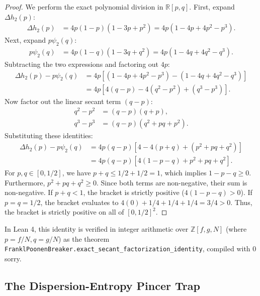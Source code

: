 \documentclass[11pt,a4paper]{article}
\theoremstyle{plain}
\theoremstyle{definition}
\theoremstyle{remark}
\newcommand{\R}{\mathbb{R}}
\newcommand{\Z}{\mathbb{Z}}
\begin{document}
\begin{proof}
We perform the exact polynomial division in $\R[p, q]$. First, expand $\Delta h_2(p)$:
\begin{align}
\Delta h_2(p) &= 4p(1-p)(1 - 3p + p^2) = 4p(1 - 4p + 4p^2 - p^3).
\end{align}
Next, expand $p \psi_2(q)$:
\begin{align}
p \psi_2(q) &= 4p(1-q)(1 - 3q + q^2) = 4p(1 - 4q + 4q^2 - q^3).
\end{align}
Subtracting the two expressions and factoring out $4p$:
\begin{align}
\Delta h_2(p) - p \psi_2(q) &= 4p \left[ (1 - 4p + 4p^2 - p^3) - (1 - 4q + 4q^2 - q^3) \right] \nonumber \\
&= 4p \left[ 4(q - p) - 4(q^2 - p^2) + (q^3 - p^3) \right].
\end{align}
Now factor out the linear secant term $(q - p)$:
\begin{align}
q^2 - p^2 &= (q - p)(q + p), \\
q^3 - p^3 &= (q - p)(q^2 + pq + p^2).
\end{align}
Substituting these identities:
\begin{align}
\Delta h_2(p) - p \psi_2(q) &= 4p(q - p) \left[ 4 - 4(p + q) + (p^2 + pq + q^2) \right] \nonumber \\
&= 4p(q - p) \left[ 4(1 - p - q) + p^2 + pq + q^2 \right].
\end{align}
For $p, q \in [0, 1/2]$, we have $p + q \le 1/2 + 1/2 = 1$, which implies $1 - p - q \ge 0$. Furthermore, $p^2 + pq + q^2 \ge 0$. Since both terms are non-negative, their sum is non-negative. If $p + q < 1$, the bracket is strictly positive ($4(1 - p - q) > 0$). If $p = q = 1/2$, the bracket evaluates to $4(0) + 1/4 + 1/4 + 1/4 = 3/4 > 0$. Thus, the bracket is strictly positive on all of $[0, 1/2]^2$.
\end{proof}

In Lean 4, this identity is verified in integer arithmetic over $\Z[f, g, N]$ (where $p = f/N, q = g/N$) as the theorem \texttt{FranklPoonenBreaker.exact\_secant\_factorization\_identity}, compiled with 0 sorry.

\subsection{The Dispersion-Entropy Pincer Trap}
\end{document}
